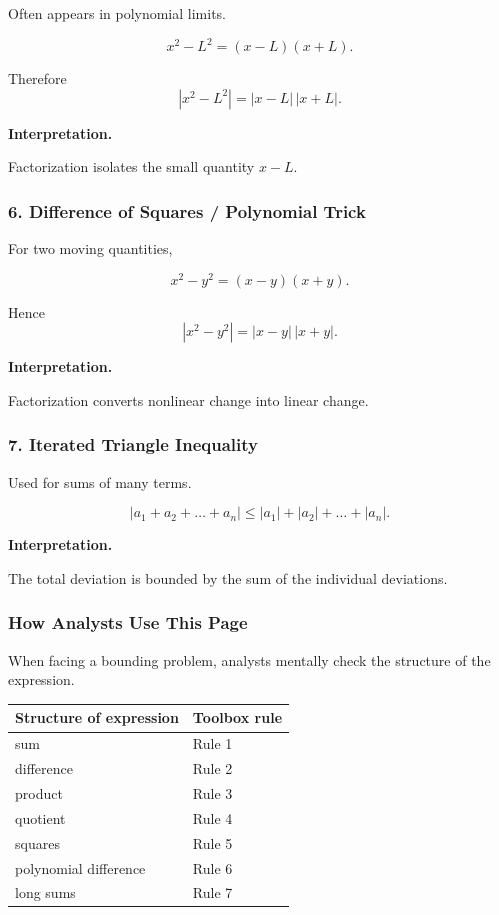 Often appears in polynomial limits.

\[
x^2 - L^2 = (x-L)(x+L).
\]

Therefore
\[
|x^2-L^2|
=
|x-L|\,|x+L|.
\]

\textbf{Interpretation.}

Factorization isolates the small quantity $x-L$.

\bigskip

\subsubsection*{6. Difference of Squares / Polynomial Trick}

For two moving quantities,

\[
x^2 - y^2 = (x-y)(x+y).
\]

Hence
\[
|x^2-y^2|
=
|x-y|\,|x+y|.
\]

\textbf{Interpretation.}

Factorization converts nonlinear change into linear change.

\bigskip

\subsubsection*{7. Iterated Triangle Inequality}

Used for sums of many terms.

\[
|a_1+a_2+\dots+a_n|
\le
|a_1|+|a_2|+\dots+|a_n|.
\]

\textbf{Interpretation.}

The total deviation is bounded by the sum of the individual deviations.

\bigskip

\subsubsection*{How Analysts Use This Page}

When facing a bounding problem, analysts mentally check the structure
of the expression.

\begin{center}
\begin{tabular}{ll}
\textbf{Structure of expression} & \textbf{Toolbox rule} \\
\hline
sum & Rule 1 \\
difference & Rule 2 \\
product & Rule 3 \\
quotient & Rule 4 \\
squares & Rule 5 \\
polynomial difference & Rule 6 \\
long sums & Rule 7 \\
\end{tabular}
\end{center}

